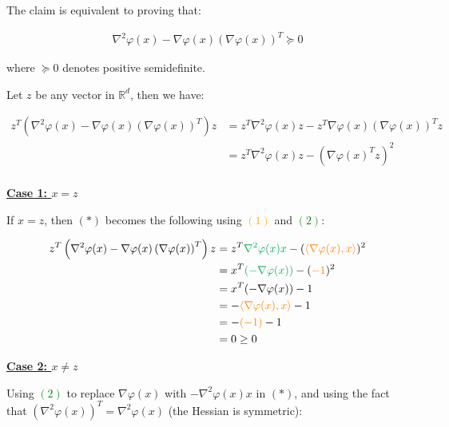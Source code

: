 \documentclass{article}
\begin{document}
The claim is equivalent to proving that:

\begin{align*}
    \nabla^2 \varphi ( x ) - \nabla \varphi ( x ) \left( \nabla \varphi (x) \right)^T \succeq 0
\end{align*}

where $\succeq 0$ denotes positive semidefinite.

Let $z$ be any vector in $\mathbb{R}^d$, then we have:

\begin{align*}
    z^T \left( \nabla^2 \varphi ( x ) - \nabla \varphi ( x ) \left( \nabla \varphi (x) \right)^T \right) z
    &= z^T \nabla^2 \varphi ( x ) z - z^T \nabla \varphi ( x ) \left( \nabla \varphi (x) \right)^T z \\
    &= z^T \nabla^2 \varphi ( x ) z - \left( \nabla \varphi ( x )^T z \right)^2 \tag{*}\\
\end{align*}

\textbf{\underline{Case 1: $x = z$}}
\bigskip

If $x = z$, then $(*)$ becomes the following using \textcolor{orange}{$(1)$} and \textcolor{Green}{$(2)$}:

\begin{align*}
    z^T \left( \nabla^2 \varphi ( x ) - \nabla \varphi ( x ) \left( \nabla \varphi (x) \right)^T \right) z 
    &= z^T \textcolor{Green}{\nabla^2 \varphi ( x ) x} - (\textcolor{orange}{\langle \nabla \varphi ( x ), x \rangle})^2 \\
    &= x^T \textcolor{Green}{(- \nabla \varphi ( x ))} - (\textcolor{orange}{-1})^2 \\
    &= x^T (- \nabla \varphi ( x )) - 1 \\
    &= - \textcolor{orange}{\langle \nabla \varphi ( x ), x \rangle} - 1 \\
    &= - \textcolor{orange}{(-1)} - 1 \\
    &= 0 \geq 0 
\end{align*}

\textbf{\underline{Case 2: $x \neq z$}}
\bigskip

Using \textcolor{Green}{$(2)$} to replace $\nabla \varphi (x)$ with $- \nabla^2 \varphi ( x ) x$ in $(*)$, 
and using the fact that $(\nabla^2 \varphi ( x ))^T = \nabla^2 \varphi ( x )$ (the Hessian is symmetric):
\end{document}
